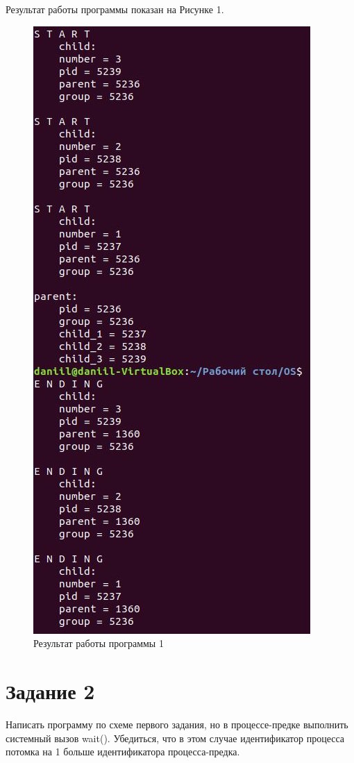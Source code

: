 \documentclass[14pt, a4paper]{extarticle}
\begin{document}
	\clearpage
	Результат работы программы показан на Рисунке 1.
	\begin{figure}[h]
		\centering
		\includegraphics[scale=1]{source/1}
		\caption{Результат работы программы 1}
	\end{figure}
	
	\clearpage
	\section*{Задание 2}
	Написать программу по схеме первого задания, но в процессе-предке выполнить системный вызов wait(). Убедиться, что в этом случае идентификатор процесса потомка на 1 больше идентификатора процесса-предка.\par
	
\end{document}
